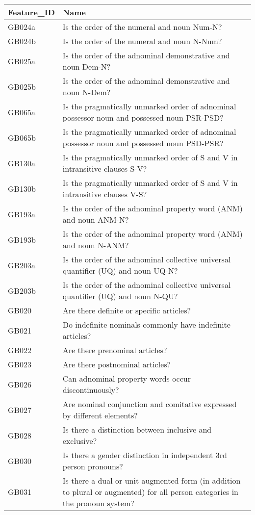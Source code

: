 \begin{longtable}{p{3cm}p{12cm}}
  \toprule
Feature\_ID & Name \\ 
  \midrule
GB024a & Is the order of the numeral and noun Num-N? \\ 
  GB024b & Is the order of the numeral and noun N-Num? \\ 
  GB025a & Is the order of the adnominal demonstrative and noun Dem-N? \\ 
  GB025b & Is the order of the adnominal demonstrative and noun N-Dem? \\ 
  GB065a & Is the pragmatically unmarked order of adnominal possessor noun and possessed noun PSR-PSD? \\ 
  GB065b & Is the pragmatically unmarked order of adnominal possessor noun and possessed noun PSD-PSR? \\ 
  GB130a & Is the pragmatically unmarked order of S and V in intransitive clauses S-V? \\ 
  GB130b & Is the pragmatically unmarked order of S and V in intransitive clauses V-S? \\ 
  GB193a & Is the order of the adnominal property word (ANM) and noun ANM-N? \\ 
  GB193b & Is the order of the adnominal property word (ANM) and noun N-ANM? \\ 
  GB203a & Is the order of the adnominal collective universal quantifier (UQ) and noun UQ-N? \\ 
  GB203b & Is the order of the adnominal collective universal quantifier (UQ) and noun N-QU? \\ 
  GB020 & Are there definite or specific articles? \\ 
  GB021 & Do indefinite nominals commonly have indefinite articles? \\ 
  GB022 & Are there prenominal articles? \\ 
  GB023 & Are there postnominal articles? \\ 
  GB026 & Can adnominal property words occur discontinuously? \\ 
  GB027 & Are nominal conjunction and comitative expressed by different elements? \\ 
  GB028 & Is there a distinction between inclusive and exclusive? \\ 
  GB030 & Is there a gender distinction in independent 3rd person pronouns? \\ 
  GB031 & Is there a dual or unit augmented form (in addition to plural or augmented) for all person categories in the pronoun system? \\ 

\end{longtable}
